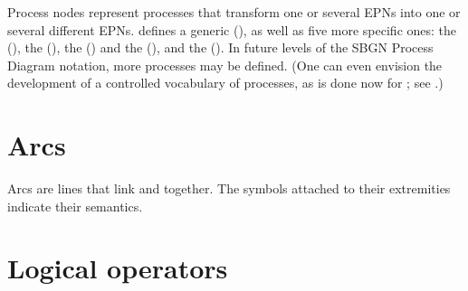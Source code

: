 Process nodes represent processes that transform one or several EPNs into one or several different EPNs.   \SBGNPDLone defines a generic  (), as well as five more specific ones: the  (), the  (), the  () and the  (), and the  ().  In future levels of the SBGN Process Diagram notation, more processes may be defined.  (One can even envision the development of a controlled vocabulary of processes, as is done now for ; see .)









\section{Arcs}\label{sec:arcs}

Arcs are lines that link  and  together.  The symbols attached to their extremities indicate their semantics.













\section{Logical operators}\label{sec:logic}





